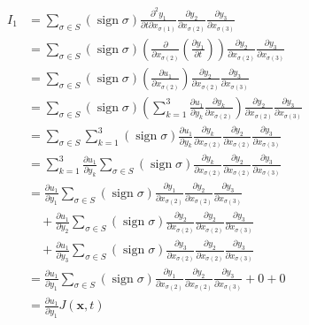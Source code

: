 \begin{equation}
\begin{aligned}
I_1
&= \sum_{\sigma\in S} \left(\operatorname{sign} \sigma\right)
\frac{\partial^2 y_1}{\partial t\partial x_{\sigma(1)}}
\frac{\partial y_2}{\partial x_{\sigma(2)}}
\frac{\partial y_3}{\partial x_{\sigma(3)}}\\
&= \sum_{\sigma\in S} \left(\operatorname{sign} \sigma\right)
\left(\frac{\partial}{\partial x_{\sigma(2)}} \left(\frac{\partial y_1}{\partial t}\right)\right)
\frac{\partial y_2}{\partial x_{\sigma(2)}}
\frac{\partial y_3}{\partial x_{\sigma(3)}}\\
&= \sum_{\sigma\in S} \left(\operatorname{sign} \sigma\right)
\left(\frac{\partial u_1}{\partial x_{\sigma(2)}}\right)
\frac{\partial y_2}{\partial x_{\sigma(2)}}
\frac{\partial y_3}{\partial x_{\sigma(3)}}\\
&= \sum_{\sigma\in S} \left(\operatorname{sign} \sigma\right)
\left(\sum_{k=1}^{3}\frac{\partial u_1}{\partial y_k}\frac{\partial y_k}{\partial x_{\sigma(2)}}\right)
\frac{\partial y_2}{\partial x_{\sigma(2)}}
\frac{\partial y_3}{\partial x_{\sigma(3)}}\\
&= \sum_{\sigma\in S} \sum_{k=1}^{3}\left(\operatorname{sign} \sigma\right)
\frac{\partial u_1}{\partial y_k}\frac{\partial y_k}{\partial x_{\sigma(2)}}
\frac{\partial y_2}{\partial x_{\sigma(2)}}
\frac{\partial y_3}{\partial x_{\sigma(3)}}\\
&= \sum_{k=1}^{3} \frac{\partial u_1}{\partial y_k}
\sum_{\sigma\in S} \left(\operatorname{sign} \sigma\right)
\frac{\partial y_k}{\partial x_{\sigma(2)}}
\frac{\partial y_2}{\partial x_{\sigma(2)}}
\frac{\partial y_3}{\partial x_{\sigma(3)}}\\
&= \frac{\partial u_1}{\partial y_1}
\sum_{\sigma\in S} \left(\operatorname{sign} \sigma\right)
\frac{\partial y_1}{\partial x_{\sigma(2)}}
\frac{\partial y_2}{\partial x_{\sigma(2)}}
\frac{\partial y_3}{\partial x_{\sigma(3)}}\\
&\quad + \frac{\partial u_1}{\partial y_2}
\sum_{\sigma\in S} \left(\operatorname{sign} \sigma\right)
\frac{\partial y_2}{\partial x_{\sigma(2)}}
\frac{\partial y_2}{\partial x_{\sigma(2)}}
\frac{\partial y_3}{\partial x_{\sigma(3)}}\\
&\quad+ \frac{\partial u_1}{\partial y_3}
\sum_{\sigma\in S} \left(\operatorname{sign} \sigma\right)
\frac{\partial y_3}{\partial x_{\sigma(2)}}
\frac{\partial y_2}{\partial x_{\sigma(2)}}
\frac{\partial y_3}{\partial x_{\sigma(3)}}\\
&= \frac{\partial u_1}{\partial y_1}
\sum_{\sigma\in S} \left(\operatorname{sign} \sigma\right)
\frac{\partial y_1}{\partial x_{\sigma(2)}}
\frac{\partial y_2}{\partial x_{\sigma(2)}}
\frac{\partial y_3}{\partial x_{\sigma(3)}} + 0 + 0\\
&= \frac{\partial u_1}{\partial y_1} J (\textbf{x},t)
\end{aligned}
\end{equation}
